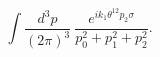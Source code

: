 \begin{equation}
  \int \frac{d^3 p}{(2 \pi)^3}~
  \frac{e^{i k_1 \theta^{12} p_2 \sigma}}{p_0^2 + p_1^2 + p_2^2}.
\end{equation}

